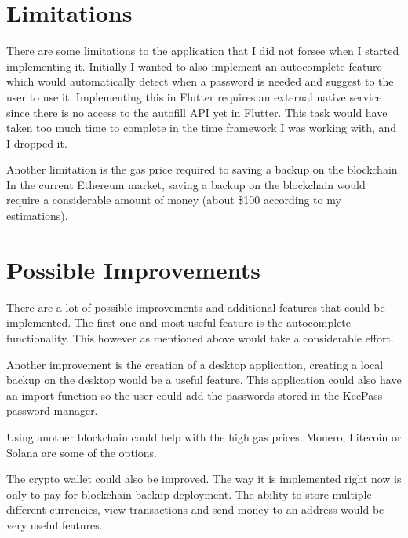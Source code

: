 \documentclass[a4paper,12pt]{report}
\begin{document}
\section{Limitations}

There are some limitations to the application that I did not forsee when I
started implementing it. Initially I wanted to also implement an autocomplete
feature which would automatically detect when a password is needed and suggest
to the user to use it. Implementing this in Flutter requires an external native
service since there is no access to the autofill API yet in Flutter. This task
would have taken too much time to complete in the time framework I was working
with, and I dropped it.

Another limitation is the gas price required to saving a backup on the
blockchain. In the current Ethereum market, saving a backup on the blockchain
would require a considerable amount of money (about \$100 according to my
estimations).

\section{Possible Improvements}

There are a lot of possible improvements and additional features that could be
implemented. The first one and most useful feature is the autocomplete
functionality. This however as mentioned above would take a considerable
effort.

Another improvement is the creation of a desktop application, creating a local
backup on the desktop would be a useful feature. This application could also
have an import function so the user could add the passwords stored in the
KeePass\cite{keepass} password manager.

Using another blockchain could help with the high gas prices. Monero, Litecoin
or Solana are some of the options.

The crypto wallet could also be improved. The way it is implemented right now
is only to pay for blockchain backup deployment. The ability to store multiple
different currencies, view transactions and send money to an address would be
very useful features.

 
\end{document}
